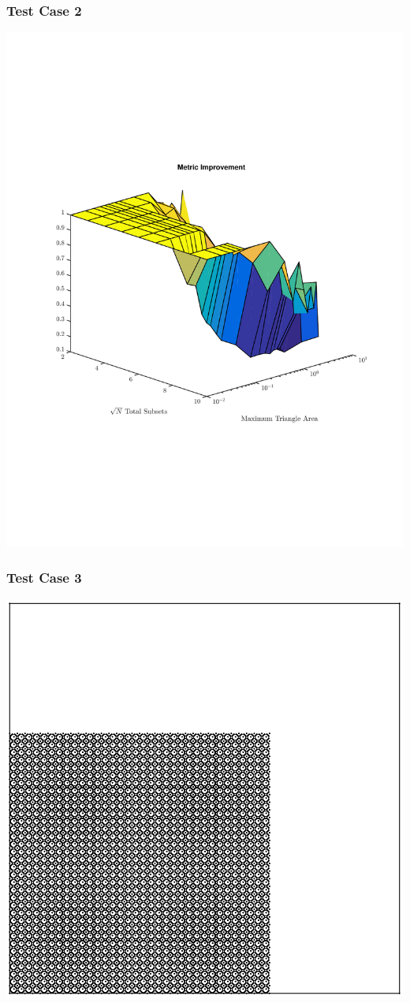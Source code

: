 \documentclass[]{beamer}
\begin{document}
\begin{frame}[t]\frametitle{Test Case 2}
\includegraphics[scale=0.47, trim = 0cm 8cm 0cm 7cm]{figures/SameDiff.pdf}
\end{frame}

\begin{frame}[t]\frametitle{Test Case 3}
\centering
\includegraphics[scale = 0.4]{figures/lattice-12-shifted-eps-converted-to.pdf}
\end{frame}
\end{document}

